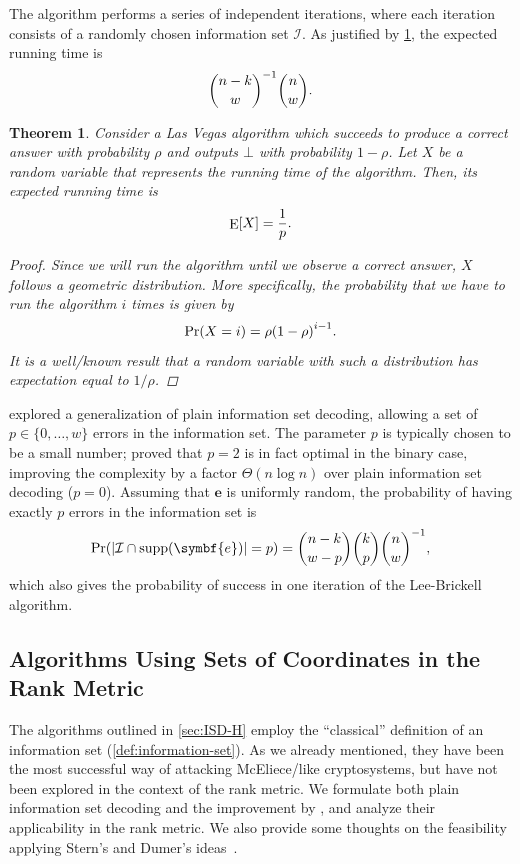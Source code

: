 \documentclass[version=last, paper=A4, parskip=half, oneside]{scrbook}
\theoremstyle{plain}
\newtheorem{theorem}{Theorem}
\theoremstyle{definition}
\theoremstyle{remark}
\renewcommand*{\vec}{\symbf}
\DeclareMathOperator{\supp}{supp}
\DeclareMathOperator{\E}{E}
\DeclarePairedDelimiter{\card}{\lvert}{\rvert}
\begin{document}
The algorithm performs a series of independent iterations, where each iteration
consists of a randomly chosen information set \(\mathcal{I}\).  As justified by
\cref{thm:las-vegas-running-time}, the expected running time is
\[
  \binom{n - k}{w}^{-1}\binom{n}{w}\text.
\]

\begin{theorem}\label{thm:las-vegas-running-time}
  Consider a Las Vegas algorithm which succeeds to produce a correct answer with
  probability \(\rho\) and outputs \(\bot\) with probability \(1 - \rho\).  Let
  \(X\) be a random variable that represents the running time of the algorithm.
  Then, its expected running time is
  \[
    \E[X] = \frac{1}{p}\text.
  \]
  \begin{proof}
    Since we will run the algorithm until we observe a correct answer, \(X\)
    follows a geometric distribution.  More specifically, the probability that
    we have to run the algorithm \(i\) times is given by
    \[
      \Pr(X = i) = \rho {(1 - \rho)}^{i - 1}\text.
    \]
    It is a well\-/known result that a random variable with such a distribution
    has expectation equal to \(1 / {\rho}\).
  \end{proof}
\end{theorem}

\Textcite{LB88} explored a generalization of plain information set decoding,
allowing a set of \(p \in \{0, \ldots, w\}\) errors in the information set.
The parameter \(p\) is typically chosen to be a small number; \textcite{Pet11}
proved that \(p = 2\) is in fact optimal in the binary case, improving the
complexity by a factor \(\Theta(n \log n)\) over plain information set decoding
(\(p = 0\)).  Assuming that \(\vec{e}\) is uniformly random, the probability of
having exactly \(p\) errors in the information set is
\[
  \Pr(\card{\mathcal{I} \cap \supp(\vec{e})} = p) =
  \binom{n - k}{w - p}\binom{k}{p}\binom{n}{w}^{-1}\text,
\]
which also gives the probability of success in one iteration of the
Lee\--Brickell algorithm.

\subsection{Algorithms Using Sets of Coordinates in the Rank
  Metric}\label{sec:ISD-R-SC}

The algorithms outlined in \cref{sec:ISD-H} employ the \enquote{classical}
definition of an information set (\cref{def:information-set}).  As we already
mentioned, they have been the most successful way of attacking McEliece\-/like
cryptosystems, but have not been explored in the context of the rank metric.  We
formulate both plain information set decoding and the improvement by
\textcite{LB88}, and analyze their applicability in the rank metric.  We also
provide some thoughts on the feasibility applying Stern's and Dumer's
ideas~\cite{Ste89, Dum96}.
\end{document}
